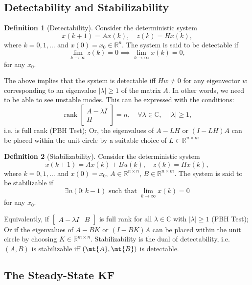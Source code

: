 \documentclass[margin=tiny]{hsrzf}
\theoremstyle{plain}
\theoremstyle{definition}
\newtheorem{defn}{Definition}[section]
\theoremstyle{remark}
\DeclareMathOperator{\rank}{rank}
\begin{document}
\subsection{Detectability and Stabilizability}

\begin{defn}[Detectability]
  Consider the deterministic system
  \[
    x(k+1) = Ax(k), \quad
    z(k) = Hx(k),
  \]
  where $k = 0, 1, \ldots $ and $x(0) = x_0 \in \mathbb{R}^n$. The system is
  said to be detectable if
  \[
    \lim_{k\to\infty} z(k) = 0 \implies \lim_{k\to\infty} x(k) = 0,
  \]
  for any $x_0$.
\end{defn}

The above implies that the system is detectable iff $Hw \neq 0$ for any
eigenvector $w$ corresponding to an eigenvalue $|\lambda| \geq 1$ of the matrix
$A$. In other words, we need to be able to see unstable modes. This can be
expressed with the conditions:
\[
  \rank \begin{bmatrix}
    A - \lambda I \\
    H
  \end{bmatrix} = n, 
  \quad \forall \lambda \in \mathbb{C},
  \quad |\lambda| \geq 1,
\]
i.e. is full rank (PBH Test); Or, the eigenvalues of $A - LH$ or $(I - LH)A$
can be placed within the unit circle by a suitable choice of
$L\in\mathbb{R}^{n\times m}$

\begin{defn}[Stabilizability]
  Consider the deterministic system
  \[
    x(k+1) = Ax(k) + Bu(k), \quad
    z(k) = Hx(k),
  \]
  where $k = 0, 1, \ldots $ and $x(0) = x_0$, $A \in \mathbb{R}^{n\times n}$,
  $B \in\mathbb{R}^{n\times m}$. The system is said to be stabilizable if
  \[
    \exists u(0:k-1) \text{ such that } \lim_{k\to\infty} x(k) = 0
  \]
  for any $x_0$.
\end{defn}
Equivalently, if $\begin{bmatrix} A - \lambda I & B \end{bmatrix}$ is full
rank for all $\lambda \in \mathbb{C}$ with $|\lambda| \geq 1$ (PBH Test); Or
if the eigenvalues of $A - BK$ or $(I - BK)A$ can be placed within the unit
circle by choosing $K\in \mathbb{R}^{m\times n}$. Stabilizability is the dual
of detectability, i.e. $(A, B)$ is stabilizable iff $(\mt{A}, \mt{B})$ is
detectable.


\subsection{The Steady-State KF}
\end{document}
